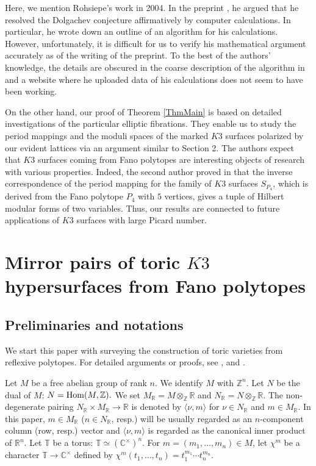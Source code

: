 \documentclass[10pt]{article}
\begin{document}
Here, we mention  Rohsiepe's work in 2004.
In the preprint \cite{R}, he argued that he resolved the Dolgachev conjecture affirmatively by  computer calculations.
In particular, he wrote down an outline of an algorithm for his calculations.
However, unfortunately, 
it is difficult for us to verify his mathematical argument accurately as of the writing of the preprint.  
To the best of the authors' knowledge, the details are obscured in the coarse description of the algorithm in \cite{R} and  a website where he uploaded data of his calculations does not seem to have been working.

On the other hand,
our  proof of Theorem \ref{ThmMain} is based on detailed investigations of  the particular  elliptic fibrations.
They enable us to study the period mappings and the moduli spaces of the marked $K3$ surfaces polarized by our evident lattices via an argument similar to \cite{NaP} Section 2.
The authors expect that $K3 $ surfaces coming from Fano polytopes  are interesting objects of research with various properties.
Indeed, the second author proved in  \cite{NaC} that the inverse correspondence of the period mapping for the family of $K3$ surfaces $S_{P_4}$, which is  derived from the Fano polytope $P_4$ with $5$ vertices, gives a tuple of Hilbert modular forms of two variables. 
Thus,  our results are connected to future applications of  $K3$ surfaces with large Picard number.



\section{Mirror pairs of toric $K3$ hypersurfaces from Fano polytopes}

\subsection{Preliminaries and notations}

We start this paper with surveying the construction of toric varieties from reflexive polytopes.
For detailed arguments or proofs, see  \cite{B}, \cite{Od} and \cite{CLS}.

Let $M$ be a free abelian group of rank $n$.
We identify $M$ with $\mathbb{Z}^n.$
Let $N$ be the dual of $M$:
$N={\rm Hom}(M,\mathbb{Z}).$
We set $M_\mathbb{R}=M\otimes_\mathbb{Z} \mathbb{R}$ and $N_\mathbb{R}=N\otimes_\mathbb{Z} \mathbb{R}.$
The non-degenerate pairing $N_\mathbb{R} \times M_\mathbb{R}\rightarrow \mathbb{R}$ is denoted by
$\langle \nu,m\rangle$ for $\nu\in N_\mathbb{R}$ and $m\in M_\mathbb{R}$.
In this paper,
$m\in M_\mathbb{R}$ ($n\in N_\mathbb{R}$, resp.) will be usually regarded as an $n$-component column (row, resp.) vector 
and
$\langle \nu,m\rangle$ is regarded as the canonical inner product of $\mathbb{R}^n$.
Let $\mathbb{T}$ be a torus: $\mathbb{T} \simeq (\mathbb{C}^\times)^n$.
For $m=(m_1,\ldots, m_n)\in M$,
let $\chi^m$ be a character $\mathbb{T} \rightarrow \mathbb{C}^\times$ defined by
$\chi^m (t_1,\ldots, t_n) = t_1^{m_1}\cdots t_n^{m_n}$.
\end{document}

